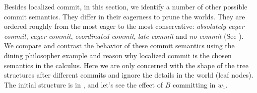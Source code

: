 Besides localized commit, in this section, we identify a number of other possible commit
semantics. They differ in their eagerness to prune the worlds.
They are ordered roughly from the most eager to the most conservative:
{\em absolutely eager commit}, {\em eager commit}, {\em coordinated commit}, {\em late commit}
and {\em no commit} (See ).
%
We compare and contrast the behavior of these commit semantics
using the dining philosopher example and reason why localized commit
is the chosen semantics in the calculus.
Here we are only concerned with the shape of the tree structures
after different commits and ignore the details in the world (leaf nodes).
The initial structure is in ,
and let's see the effect of $B$ committing in $w_1$.
